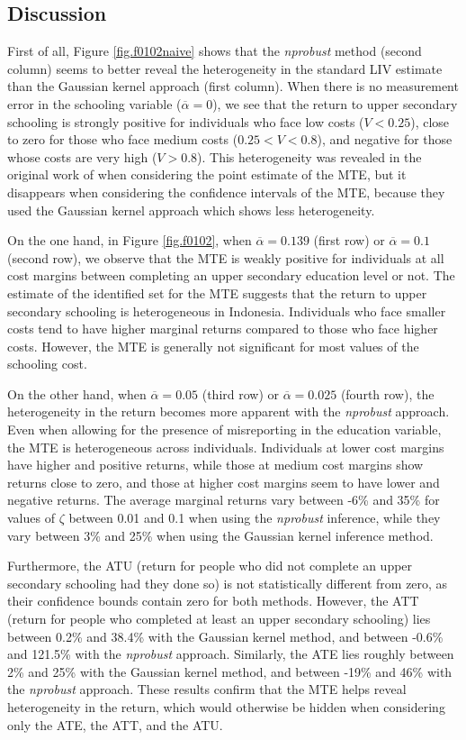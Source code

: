 \documentclass[11pt,reqno]{amsart}
\theoremstyle{plain}
\numberwithin{equation}{section}
\begin{document}
\subsection*{Discussion}
First of all, Figure \ref{fig.f0102naive} shows that the \textit{nprobust} method (second column) seems to better reveal the heterogeneity in the standard LIV estimate than the Gaussian kernel approach (first column). When there is no measurement error in the schooling variable  ($\overline{\alpha} = 0$), we see that the return to upper secondary schooling is strongly positive for individuals who face low costs ($V < 0.25 $), close to zero for those who face medium costs ($0.25 < V < 0.8$), and negative for those whose costs are very high ($V>0.8$). This heterogeneity was revealed in the original work of \cite{Carneiroal2017} when considering the point estimate of the MTE, but it disappears when considering the confidence intervals of the MTE, because they used the Gaussian kernel approach which shows less heterogeneity.

On the one hand, in Figure \ref{fig.f0102}, when $\overline{\alpha}=0.139$ (first row) or $\overline{\alpha}=0.1$ (second row), we observe that the MTE is weakly positive for individuals at all cost margins between completing an upper secondary education level or not. The estimate of the identified set for the MTE suggests that the return to upper secondary schooling is heterogeneous in Indonesia. Individuals who face smaller costs tend to have higher marginal returns compared to those who face higher costs. However, the MTE is generally not significant for most values of the schooling cost. 

On the other hand, when $\overline{\alpha}=0.05$ (third row) or $\overline{\alpha}=0.025$ (fourth row), the heterogeneity in the return becomes more apparent with the \textit{nprobust} approach. Even when allowing for the presence of misreporting in the education variable, the MTE is heterogeneous across individuals. Individuals at lower cost margins have higher and positive returns, while those at medium cost margins show returns close to zero, and those at higher cost margins seem to have lower and negative returns. The average marginal returns vary between -6\% and 35\% for values of $\zeta$ between 0.01 and 0.1 when using the \textit{nprobust} inference, while they vary between 3\% and 25\% when using the Gaussian kernel inference method.

Furthermore, the ATU (return for people who did not complete an upper secondary schooling had they done so) is not statistically different from zero, as their confidence bounds contain zero for both methods. However, the ATT (return for people who completed at least an upper secondary schooling) lies between 0.2\% and 38.4\% with the Gaussian kernel method, and between -0.6\% and 121.5\% with the \textit{nprobust} approach. Similarly, the ATE lies roughly between 2\% and 25\% with the Gaussian kernel method, and between -19\% and 46\% with the \textit{nprobust} approach. These results confirm that the MTE helps reveal heterogeneity in the return, which would otherwise be hidden when considering only the ATE, the ATT, and the ATU.
\end{document}
